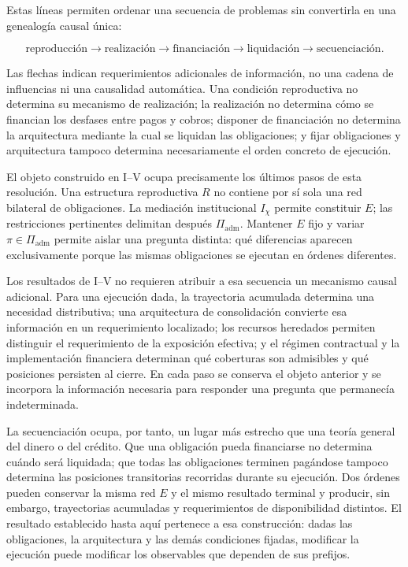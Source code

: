 \documentclass[10pt,a5paper,twoside]{article}
\begin{document}
Estas líneas permiten ordenar una secuencia de problemas sin convertirla en una
genealogía causal única:

\[
\text{reproducción}
\longrightarrow
\text{realización}
\longrightarrow
\text{financiación}
\longrightarrow
\text{liquidación}
\longrightarrow
\text{secuenciación}.
\]

Las flechas indican requerimientos adicionales de información, no una cadena de
influencias ni una causalidad automática. Una condición reproductiva no
determina su mecanismo de realización; la realización no determina cómo se
financian los desfases entre pagos y cobros; disponer de financiación no
determina la arquitectura mediante la cual se liquidan las obligaciones; y
fijar obligaciones y arquitectura tampoco determina necesariamente el orden
concreto de ejecución.

El objeto construido en I--V ocupa precisamente los últimos pasos de esta
resolución. Una estructura reproductiva \(R\) no contiene por sí sola una red
bilateral de obligaciones. La mediación institucional \(I_\chi\) permite
constituir \(E\); las restricciones pertinentes delimitan después
\(\Pi_{\mathrm{adm}}\). Mantener \(E\) fijo y variar
\(\pi\in\Pi_{\mathrm{adm}}\) permite aislar una pregunta distinta: qué
diferencias aparecen exclusivamente porque las mismas obligaciones se ejecutan
en órdenes diferentes.

Los resultados de I--V no requieren atribuir a esa secuencia un mecanismo
causal adicional. Para una ejecución dada, la trayectoria acumulada determina
una necesidad distributiva; una arquitectura de consolidación convierte esa
información en un requerimiento localizado; los recursos heredados permiten
distinguir el requerimiento de la exposición efectiva; y el régimen contractual
y la implementación financiera determinan qué coberturas son admisibles y qué
posiciones persisten al cierre. En cada paso se conserva el objeto anterior y se
incorpora la información necesaria para responder una pregunta que permanecía
indeterminada.

La secuenciación ocupa, por tanto, un lugar más estrecho que una teoría general
del dinero o del crédito. Que una obligación pueda financiarse no determina
cuándo será liquidada; que todas las obligaciones terminen pagándose tampoco
determina las posiciones transitorias recorridas durante su ejecución. Dos
órdenes pueden conservar la misma red \(E\) y el mismo resultado terminal y
producir, sin embargo, trayectorias acumuladas y requerimientos de disponibilidad
distintos. El resultado establecido hasta aquí pertenece a esa construcción:
dadas las obligaciones, la arquitectura y las demás condiciones fijadas,
modificar la ejecución puede modificar los observables que dependen de sus
prefijos.
\end{document}
